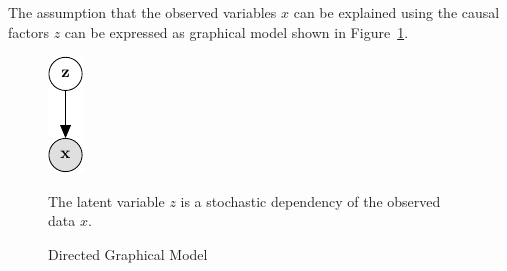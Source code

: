 



The assumption that the observed variables $x$ can be explained using the causal factors $z$ can be expressed as graphical model shown in Figure~\ref{fig:dgm}.

\begin{figure}[htb]
\centering
\includegraphics{media/directed_graphical_model}
  \caption[Graphical Model]{Directed Graphical Model}
\label{fig:dgm}
  \medskip
  \small
  The latent variable $z$ is a stochastic dependency of the observed data $x$.
\end{figure}


\newpage













